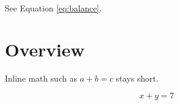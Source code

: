 \documentclass{article}
\begin{document}
\noindent See Equation \ref{eq:balance}.

\section{Overview}
Inline math such as $a + b = c$ stays short.

\begin{equation}
\label{eq:balance}
x + y = 7
\end{equation}
\end{document}
